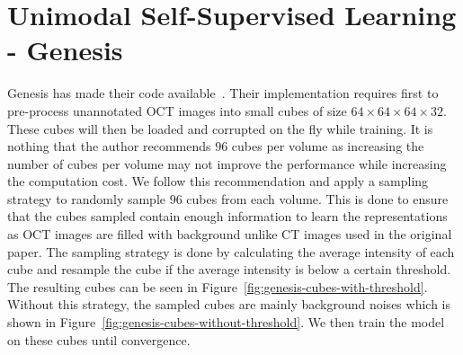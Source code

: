 \documentclass[a4paper,11pt,oneside]{report}
\begin{document}
\section{Unimodal Self-Supervised Learning - Genesis}
Genesis has made their code available~\cite{Zhou2021}. Their implementation requires first to pre-process unannotated OCT images into small cubes of size $64\times 64\times 64\times 32$. These cubes will then be loaded and corrupted on the fly while training. It is nothing that the author recommends $96$ cubes per volume as increasing the number of cubes per volume may not improve the performance while increasing the computation cost. We follow this recommendation and apply a sampling strategy to randomly sample $96$ cubes from each volume. This is done to ensure that the cubes sampled contain enough information to learn the representations as OCT images are filled with background unlike CT images used in the original paper. The sampling strategy is done by calculating the average intensity of each cube and resample the cube if the average intensity is below a certain threshold. The resulting cubes can be seen in Figure~\ref{fig:genesis-cubes-with-threshold}. Without this strategy, the sampled cubes are mainly background noises which is shown in Figure~\ref{fig:genesis-cubes-without-threshold}. We then train the model on these cubes until convergence.
\end{document}
